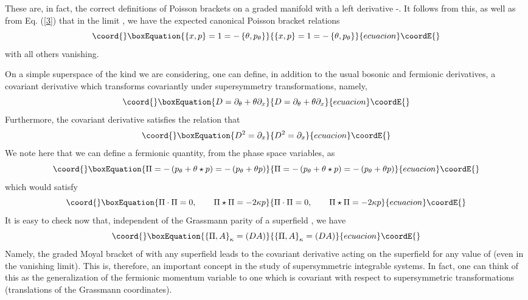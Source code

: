 \documentclass[a4paper,11pt]{article}
\begin{document}
These are, in fact, the correct definitions of Poisson brackets on a
graded manifold with a left derivative \cite{18}-\cite{19}. It follows
from  this, as well
as from Eq. (\ref{3}) that in the limit \coordHE{}, we have
the expected canonical Poisson bracket relations
\begin{equation}\coord{}\boxEquation{
\left\{x,p\right\} = 1 = - \left\{\theta,p_{\theta}\right\}
}{
\left\{x,p\right\} = 1 = - \left\{\theta,p_{\theta}\right\}
}{ecuacion}\coordE{}\end{equation}
with all others vanishing.

On a simple superspace of the kind we are considering, one can define,
in addition to the usual bosonic and fermionic derivatives, a covariant
derivative which transforms covariantly under supersymmetry
transformations, namely,
\begin{equation}\coord{}\boxEquation{
D = \partial_{\theta} + \theta \partial_{x}\label{5}
}{
D = \partial_{\theta} + \theta \partial_{x}}{ecuacion}\coordE{}\end{equation}
Furthermore, the covariant derivative satisfies the relation that
\begin{equation}\coord{}\boxEquation{
D^{2} = \partial_{x}
}{
D^{2} = \partial_{x}
}{ecuacion}\coordE{}\end{equation} 
We note here that we can define a fermionic quantity, from the phase
space variables, as
\begin{equation}\coord{}\boxEquation{
\Pi = -\left(p_{\theta}+\theta\star p\right) = - \left(p_{\theta} +
\theta p\right)\label{6}
}{
\Pi = -\left(p_{\theta}+\theta\star p\right) = - \left(p_{\theta} +
\theta p\right)}{ecuacion}\coordE{}\end{equation}
which would satisfy
\begin{equation}\coord{}\boxEquation{
\Pi\cdot\Pi = 0,\qquad \Pi\star \Pi = - 2\kappa p\label{7}
}{
\Pi\cdot\Pi = 0,\qquad \Pi\star \Pi = - 2\kappa p}{ecuacion}\coordE{}\end{equation}
It is easy to check now that, independent of the Grassmann parity of a
superfield \coordHE{}, we have
\begin{equation}\coord{}\boxEquation{
\left\{\Pi,A\right\}_{\kappa} =  (DA)
}{
\left\{\Pi,A\right\}_{\kappa} =  (DA)
}{ecuacion}\coordE{}\end{equation}
Namely, the graded Moyal bracket of \myHighlight{$\Pi$}\coordHE{} with any superfield leads to
the covariant derivative acting on the superfield for any value of
\myHighlight{$\kappa$}\coordHE{}  (even in the
vanishing \myHighlight{$\kappa$}\coordHE{} limit). This is, therefore, an important concept in
the study of supersymmetric integrable systems. In fact, one can think
of this as the generalization of the fermionic momentum variable
\coordHE{} to one which is covariant with respect to supersymmetric
transformations (translations of the Grassmann coordinates).
\end{document}
